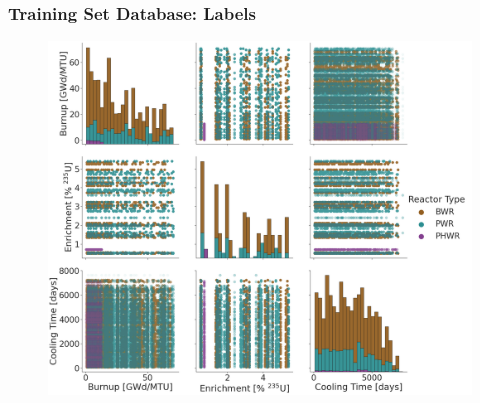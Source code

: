 \begin{frame}
  \frametitle{Training Set Database: Labels}
  \begin{figure}
    \centering
      \includegraphics[height=0.85\textheight]{./figures/histogram_scatter_trainset_viz.png}
  \end{figure}
\end{frame}

